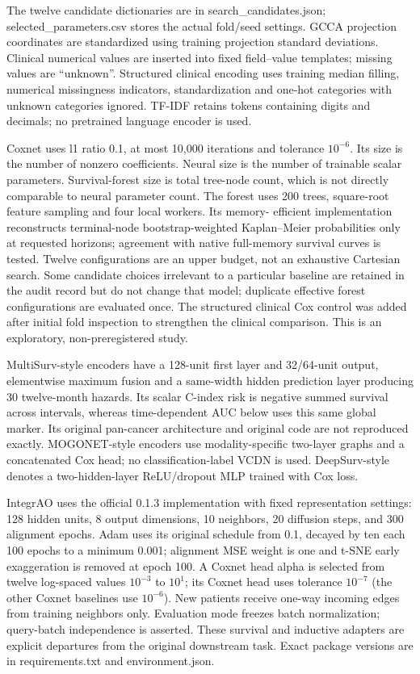 \documentclass[10pt]{article}
\begin{document}
The twelve candidate dictionaries are in search\_candidates.json;
selected\_parameters.csv stores the actual fold/seed settings. GCCA projection
coordinates are standardized using training projection standard deviations.
Clinical numerical values are inserted into fixed field--value templates;
missing values are ``unknown''. Structured clinical encoding uses training
median filling, numerical missingness indicators, standardization and one-hot
categories with unknown categories ignored. TF-IDF retains tokens containing
digits and decimals; no pretrained language encoder is used.

Coxnet uses l1 ratio 0.1, at most 10,000 iterations and tolerance $10^{-6}$.
Its size is the number of nonzero coefficients. Neural size is the number of
trainable scalar parameters. Survival-forest size is total tree-node count,
which is not directly comparable to neural parameter count. The forest uses
200 trees, square-root feature sampling and four local workers. Its memory-
efficient implementation reconstructs terminal-node bootstrap-weighted
Kaplan--Meier probabilities only at requested horizons; agreement with native
full-memory survival curves is tested. Twelve configurations are an upper budget, not an
exhaustive Cartesian search. Some candidate choices irrelevant to a particular
baseline are retained in the audit record but do not change that model;
duplicate effective forest configurations are evaluated once. The structured
clinical Cox control was added after initial fold inspection to strengthen
the clinical comparison. This is an exploratory, non-preregistered study.

MultiSurv-style encoders have a 128-unit first layer and 32/64-unit output,
elementwise maximum fusion and a same-width hidden prediction layer producing
30 twelve-month hazards. Its scalar C-index risk is negative summed survival
across intervals, whereas time-dependent AUC below uses this same global marker.
Its original pan-cancer architecture and original code are not reproduced exactly.
MOGONET-style encoders use modality-specific two-layer graphs and a concatenated
Cox head; no classification-label VCDN is used. DeepSurv-style denotes a
two-hidden-layer ReLU/dropout MLP trained with Cox loss.

IntegrAO uses the official 0.1.3 implementation with fixed representation
settings: 128 hidden units, 8 output dimensions, 10 neighbors, 20 diffusion
steps, and 300 alignment epochs. Adam uses its original schedule from 0.1,
decayed by ten each 100 epochs to a minimum 0.001; alignment MSE weight is
one and t-SNE early exaggeration is removed at epoch 100. A Coxnet head alpha
is selected from twelve log-spaced values $10^{-3}$ to $10^1$; its Coxnet
head uses tolerance $10^{-7}$ (the other Coxnet baselines use $10^{-6}$). New patients
receive one-way incoming edges from training neighbors only. Evaluation mode
freezes batch normalization; query-batch independence is asserted. These
survival and inductive adapters are explicit departures from the original
downstream task. Exact package versions are in requirements.txt and environment.json.
\end{document}
